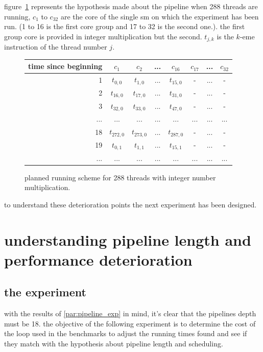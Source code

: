 \documentclass{report}
\begin{document}
    figure~\ref{fig:int_prediction_256} represents the hypothesis made about the pipeline when 288
    threads are running, $c_1$ to $c_{32}$ are the core of the single sm on which the experiment
    has been run. (1 to 16 is the first core group and 17 to 32 is the second one.). the first
    group core is provided in integer multiplication but the second. $t_{j,k}$ is the $k$-eme instruction of the thread number
    $j$.
   \begin{figure}[h]
      \centering
       \begin{tabular}{ | r || c | c | c | c || c | c | c | }
    	    \hline
    	    time since beginning & $c_1$ & $c_2$ & ... & $c_{16}$ & $c_{17}$ & ... & $c_{32}$ \\ \hline  \hline
    	   1 & $t_{0,0}$ & $t_{1,0}$ & ... & $t_{15,0}$ & - & ... & - \\ \hline 
    	   2 & $t_{16,0}$ & $t_{17,0}$ & ... & $t_{31,0}$ & - & ... & - \\ \hline
    	   3 & $t_{32,0}$ & $t_{33,0}$ & ... & $t_{47,0}$ & - & ... & - \\ \hline
    	   ... & ... & ... & ... & ... & ... & ... & ... \\ \hline
    	   18 & $t_{272,0}$ & $t_{273,0}$ & ... & $t_{287,0}$ & - & ... & - \\ \hline
    	   19 & $t_{0,1}$ & $t_{1,1}$ & ... & $t_{15,1}$ & - & ... & - \\ \hline
    	   ... & ... & ... & ... & ... & ... & ... & ... \\ \hline
  	\end{tabular}
  	\captionsetup{justification=centering}
  	\caption{planned running scheme for 288 threads with integer number multiplication.}
  	\label{fig:int_prediction_256}
   \end{figure}

    to understand these deterioration points the next experiment has been designed.

\section{understanding pipeline length and performance deterioration}
    \subsection{the experiment}
    with the results of \ref{par:pipeline_exp} in mind, it's clear that the pipelines depth 
    must be 18. the objective of the following experiment is to determine the cost of
    the loop used in the benchmarks to adjust the running times found and see if they match with
    the hypothesis about pipeline length and scheduling. 
\end{document}
